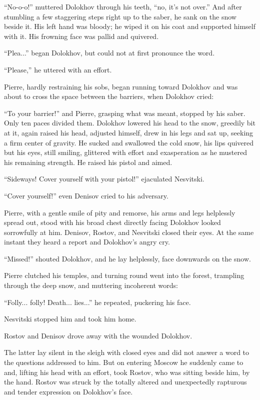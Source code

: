 ``No-o-o!'' muttered Dolokhov through his teeth, ``no, it's not
over.'' And after stumbling a few staggering steps right up to
the saber, he sank on the snow beside it. His left hand was
bloody; he wiped it on his coat and supported himself with
it. His frowning face was pallid and quivered.

``Plea...'' began Dolokhov, but could not at first pronounce the
word.

``Please,'' he uttered with an effort.

Pierre, hardly restraining his sobs, began running toward
Dolokhov and was about to cross the space between the barriers,
when Dolokhov cried:

``To your barrier!'' and Pierre, grasping what was meant, stopped
by his saber. Only ten paces divided them. Dolokhov lowered his
head to the snow, greedily bit at it, again raised his head,
adjusted himself, drew in his legs and sat up, seeking a firm
center of gravity. He sucked and swallowed the cold snow, his
lips quivered but his eyes, still smiling, glittered with effort
and exasperation as he mustered his remaining strength. He raised
his pistol and aimed.

``Sideways! Cover yourself with your pistol!'' ejaculated
Nesvitski.

``Cover yourself!'' even Denisov cried to his adversary.

Pierre, with a gentle smile of pity and remorse, his arms and
legs helplessly spread out, stood with his broad chest directly
facing Dolokhov looked sorrowfully at him. Denisov, Rostov, and
Nesvitski closed their eyes. At the same instant they heard a
report and Dolokhov's angry cry.

``Missed!'' shouted Dolokhov, and he lay helplessly, face
downwards on the snow.

Pierre clutched his temples, and turning round went into the
forest, trampling through the deep snow, and muttering incoherent
words:

``Folly... folly! Death... lies...'' he repeated, puckering his
face.

Nesvitski stopped him and took him home.

Rostov and Denisov drove away with the wounded Dolokhov.

The latter lay silent in the sleigh with closed eyes and did not
answer a word to the questions addressed to him. But on entering
Moscow he suddenly came to and, lifting his head with an effort,
took Rostov, who was sitting beside him, by the hand. Rostov was
struck by the totally altered and unexpectedly rapturous and
tender expression on Dolokhov's face.

